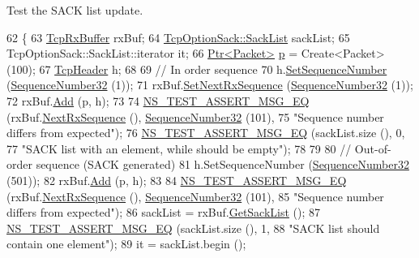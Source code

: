 Test the S\+A\+CK list update. 


\begin{DoxyCode}
62 \{
63   \hyperlink{classns3_1_1TcpRxBuffer}{TcpRxBuffer} rxBuf;
64   \hyperlink{classns3_1_1TcpOptionSack_a2aa2d721c71424680d79ebaa079f264a}{TcpOptionSack::SackList} sackList;
65   TcpOptionSack::SackList::iterator it;
66   \hyperlink{classns3_1_1Ptr}{Ptr<Packet>} \hyperlink{lte__link__budget_8m_ac9de518908a968428863f829398a4e62}{p} = Create<Packet> (100);
67   \hyperlink{classns3_1_1TcpHeader}{TcpHeader} h;
68 
69   \textcolor{comment}{// In order sequence}
70   h.\hyperlink{classns3_1_1TcpHeader_a3483eb1604d7db47b1163b02f74bcc25}{SetSequenceNumber} (\hyperlink{classns3_1_1SequenceNumber}{SequenceNumber32} (1));
71   rxBuf.\hyperlink{classns3_1_1TcpRxBuffer_a6bba147c19d638ec455b208ccbcaafb4}{SetNextRxSequence} (\hyperlink{classns3_1_1SequenceNumber}{SequenceNumber32} (1));
72   rxBuf.\hyperlink{classns3_1_1TcpRxBuffer_a35a036383b8976cb79738c28aa01d5d0}{Add} (p, h);
73 
74   \hyperlink{group__testing_ga2a9d78cffb3db8e867c35fff0b698cf5}{NS\_TEST\_ASSERT\_MSG\_EQ} (rxBuf.\hyperlink{classns3_1_1TcpRxBuffer_ae994bf90329d10f17b59d32907b04ca9}{NextRxSequence} (), 
      \hyperlink{group__network_gacb2070e4e98d2d5135c9bede58f07a03}{SequenceNumber32} (101),
75                          \textcolor{stringliteral}{"Sequence number differs from expected"});
76   \hyperlink{group__testing_ga2a9d78cffb3db8e867c35fff0b698cf5}{NS\_TEST\_ASSERT\_MSG\_EQ} (sackList.size (), 0,
77                          \textcolor{stringliteral}{"SACK list with an element, while should be empty"});
78 
79 
80   \textcolor{comment}{// Out-of-order sequence (SACK generated)}
81   h.SetSequenceNumber (\hyperlink{classns3_1_1SequenceNumber}{SequenceNumber32} (501));
82   rxBuf.\hyperlink{classns3_1_1TcpRxBuffer_a35a036383b8976cb79738c28aa01d5d0}{Add} (p, h);
83 
84   \hyperlink{group__testing_ga2a9d78cffb3db8e867c35fff0b698cf5}{NS\_TEST\_ASSERT\_MSG\_EQ} (rxBuf.\hyperlink{classns3_1_1TcpRxBuffer_ae994bf90329d10f17b59d32907b04ca9}{NextRxSequence} (), 
      \hyperlink{group__network_gacb2070e4e98d2d5135c9bede58f07a03}{SequenceNumber32} (101),
85                          \textcolor{stringliteral}{"Sequence number differs from expected"});
86   sackList = rxBuf.\hyperlink{classns3_1_1TcpRxBuffer_afc5d672da4595330754de1bb3933a9c7}{GetSackList} ();
87   \hyperlink{group__testing_ga2a9d78cffb3db8e867c35fff0b698cf5}{NS\_TEST\_ASSERT\_MSG\_EQ} (sackList.size (), 1,
88                          \textcolor{stringliteral}{"SACK list should contain one element"});
89   it = sackList.begin ();

\end{DoxyCode}
